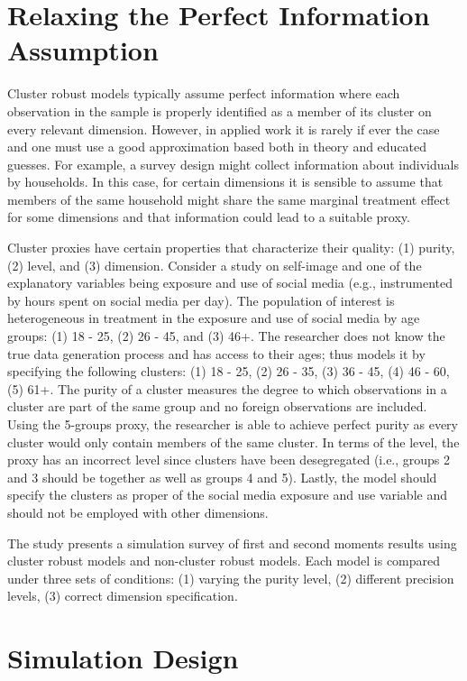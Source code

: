\documentclass{jbsc}
\begin{document}
\section{Relaxing the Perfect Information Assumption}

Cluster robust models typically assume perfect information where each observation in the sample is properly identified as a member of its cluster on every relevant dimension. However, in applied work it is rarely if ever the case and one must use a good approximation based both in theory and educated guesses. For example, a survey design might collect information about individuals by households. In this case, for certain dimensions it is sensible to assume that members of the same household might share the same marginal treatment effect for some dimensions and that information could lead to a suitable proxy.

Cluster proxies have certain properties that characterize their quality: (1) purity, (2) level, and (3) dimension. Consider a study on self-image and one of the explanatory variables being exposure and use of social media (e.g., instrumented by hours spent on social media per day). The population of interest is heterogeneous in treatment in the exposure and use of social media by age groups: (1) 18 - 25, (2) 26 - 45, and (3) 46+. The researcher does not know the true data generation process and has access to their ages; thus models it by specifying the following clusters: (1) 18 - 25, (2) 26 - 35, (3) 36 - 45, (4) 46 - 60, (5) 61+. The purity of a cluster measures the degree to which observations in a cluster are part of the same group and no foreign observations are included. Using the 5-groups proxy, the researcher is able to achieve perfect purity as every cluster would only contain members of the same cluster. In terms of the level, the proxy has an incorrect level since clusters have been desegregated (i.e., groups 2 and 3 should be together as well as groups 4 and 5). Lastly, the model should specify the clusters as proper of the social media exposure and use variable and  should not be employed with other dimensions.

The study presents a simulation survey of first and second moments results using cluster robust models and non-cluster robust models. Each model is compared under three sets of conditions: (1) varying the purity level, (2) different precision levels, (3) correct dimension specification.

\FloatBarrier
\section{Simulation Design}
\end{document}

